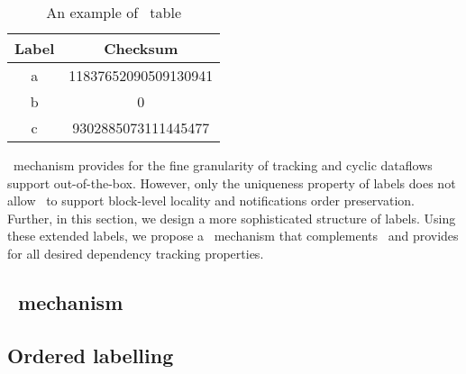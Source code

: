 \begin{table}
\caption{An example of \acker\ table}
    \begin{center}
        \begin{tabular}{ |c|c| } 
         \hline
         Label & Checksum \\ 
         \hline
         a & 11837652090509130941 \\ 
         b & 0 \\
         c & 9302885073111445477 \\
         \hline
        \end{tabular}
    \end{center}
\label{ack_table}
\end{table}

\acker\ mechanism provides for the fine granularity of tracking and cyclic dataflows support out-of-the-box. However, only the uniqueness property of labels does not allow \acker\ to support block-level locality and notifications order preservation. Further, in this section, we design a more sophisticated structure of labels. Using these extended labels, we propose a \tracker\ mechanism that complements \acker\ and provides for all desired dependency tracking properties. 

\subsection{\tracker\ mechanism}

\subsection{Ordered labelling}




